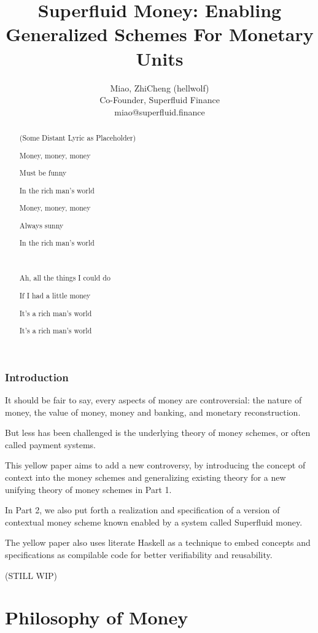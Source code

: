 \documentclass{article}
\title{Superfluid Money: Enabling Generalized Schemes For Monetary Units}
\author{
    Miao, ZhiCheng (hellwolf)\\
    Co-Founder, Superfluid Finance\\
    miao@superfluid.finance
}
\begin{document}
\maketitle

\begin{abstract}
    \begin{center}
        (Some Distant Lyric as Placeholder)

        Money, money, money

        Must be funny

        In the rich man's world

        Money, money, money

        Always sunny

        In the rich man's world

        \

        Ah, all the things I could do

        If I had a little money

        It's a rich man's world

        It's a rich man's world
    \end{center}
\end{abstract}

\section{Introduction}

It should be fair to say, every aspects of money are controversial: the nature of money, the value of money, money and
banking, and monetary reconstruction. \cite{von2013theory}

But less has been challenged is the underlying theory of money schemes, or often called payment systems.

This yellow paper aims to add a new controversy, by introducing the concept of context into the money schemes and
generalizing existing theory for a new unifying theory of money schemes in Part 1.

In Part 2, we also put forth a realization and specification of a version of contextual money scheme known enabled by a
system called Superfluid money.

The yellow paper also uses literate Haskell as a technique to embed concepts and specifications as compilable code for
better verifiability and reusability.

(STILL WIP)

\newpage
\part{Philosophy of Money}
\newpage
\end{document}
